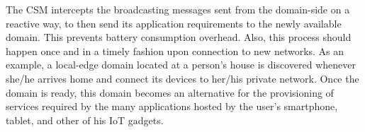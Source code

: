 The CSM intercepts the broadcasting messages sent from the domain-side on a reactive way, to then send its application requirements to the newly available domain. This prevents battery consumption overhead. Also, this process should happen once and in a timely fashion upon connection to new networks. As an example, a local-edge domain located at a person's house is discovered whenever she/he arrives home and connect its devices to her/his private network. Once the domain is ready, this domain becomes an alternative for the provisioning of services required by the many applications hosted by the user's smartphone, tablet, and other of his IoT gadgets. %






%


%
%
	

